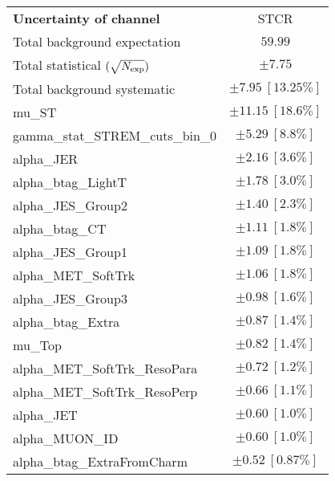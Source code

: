 
\begin{table}
\begin{center}
\setlength{\tabcolsep}{0.0pc}
\begin{tabular*}{\textwidth}{@{\extracolsep{\fill}}lc}
\noalign{\smallskip}\hline\noalign{\smallskip}
{\bf Uncertainty of channel}                                    & STCR           \\
\noalign{\smallskip}\hline\noalign{\smallskip}
Total background expectation             &  $59.99$       \\
\noalign{\smallskip}\hline\noalign{\smallskip}
Total statistical $(\sqrt{N_{\rm exp}})$              & $\pm 7.75$       \\
Total background systematic               & $\pm 7.95\ [13.25\%] $             \\
\noalign{\smallskip}\hline\noalign{\smallskip}
\noalign{\smallskip}\hline\noalign{\smallskip}
mu\_ST         & $\pm 11.15\ [18.6\%] $       \\
gamma\_stat\_STREM\_cuts\_bin\_0         & $\pm 5.29\ [8.8\%] $       \\
alpha\_JER         & $\pm 2.16\ [3.6\%] $       \\
alpha\_btag\_LightT         & $\pm 1.78\ [3.0\%] $       \\
alpha\_JES\_Group2         & $\pm 1.40\ [2.3\%] $       \\
alpha\_btag\_CT         & $\pm 1.11\ [1.8\%] $       \\
alpha\_JES\_Group1         & $\pm 1.09\ [1.8\%] $       \\
alpha\_MET\_SoftTrk         & $\pm 1.06\ [1.8\%] $       \\
alpha\_JES\_Group3         & $\pm 0.98\ [1.6\%] $       \\
alpha\_btag\_Extra         & $\pm 0.87\ [1.4\%] $       \\
mu\_Top         & $\pm 0.82\ [1.4\%] $       \\
alpha\_MET\_SoftTrk\_ResoPara         & $\pm 0.72\ [1.2\%] $       \\
alpha\_MET\_SoftTrk\_ResoPerp         & $\pm 0.66\ [1.1\%] $       \\
alpha\_JET         & $\pm 0.60\ [1.0\%] $       \\
alpha\_MUON\_ID         & $\pm 0.60\ [1.0\%] $       \\
alpha\_btag\_ExtraFromCharm         & $\pm 0.52\ [0.87\%] $       \\

\end{tabular*}
\end{center}
\end{table}
